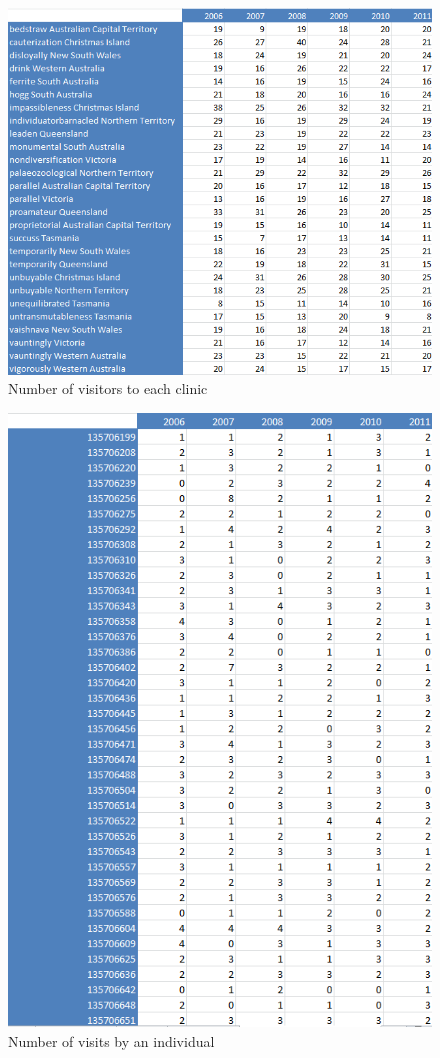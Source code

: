 \documentclass[a4paper,12pt,openbib]{article}
\begin{document}
\begin{figure}[ht!]
	\centering
	\includegraphics[width=15cm]{visitsperclinic}
	\caption{Number of visitors to each clinic}
	\label{fig:{visitsperclinic}}
\end{figure}

\begin{figure}[ht!]
	\centering
	\includegraphics[width=15cm]{visitsperperson}
	\caption{Number of visits by an individual}
	\label{fig:visitsperperson}
\end{figure}
\end{document}
